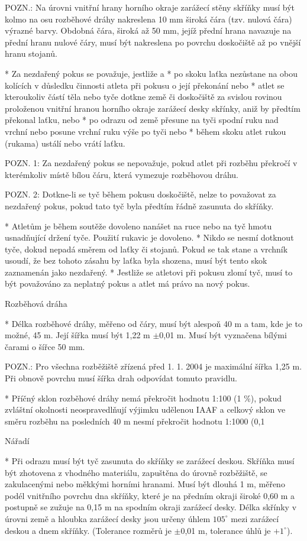 POZN.: Na úrovni vnitřní hrany horního okraje zarážecí stěny skříňky musí být kolmo na osu rozběhové dráhy nakreslena 10 mm široká čára (tzv. nulová čára) výrazné barvy. Obdobná čára, široká až 50 mm, jejíž přední hrana navazuje na přední hranu nulové čáry, musí být nakreslena po povrchu doskočiště až po vnější hranu stojanů.

* Za nezdařený pokus se považuje, jestliže
  \begitems \style a
  * po skoku laťka nezůstane na obou kolících v důsledku činnosti atleta při pokusu o její překonání nebo
  * atlet se kteroukoliv částí těla nebo tyče dotkne země či doskočiště za svislou rovinou proloženou vnitřní hranou horního okraje zarážecí desky skřínky, aniž by předtím překonal laťku, nebo
  * po odrazu od země přesune na tyči spodní ruku nad vrchní nebo posune vrchní ruku výše po tyči nebo
  * během skoku atlet rukou (rukama) ustálí nebo vrátí laťku.
  \enditems

POZN. 1: Za nezdařený pokus se nepovažuje, pokud atlet při rozběhu překročí v kterémkoliv místě bílou čáru, která vymezuje rozběhovou dráhu.

POZN. 2: Dotkne-li se tyč během pokusu doskočiště, nelze to považovat za nezdařený pokus, pokud tato tyč byla předtím řádně zasunuta do skříňky.

* Atletům je během soutěže dovoleno nanášet na ruce nebo na tyč hmotu usnadňující držení tyče. Použití rukavic je dovoleno.
* Nikdo se nesmí dotknout tyče, dokud nepadá směrem od laťky či stojanů. Pokud se tak stane a vrchník usoudí, že bez tohoto zásahu by laťka byla shozena, musí být tento skok zaznamenán jako nezdařený.
* Jestliže se atletovi při pokusu zlomí tyč, musí to být považováno za neplatný pokus a atlet má právo na nový pokus.

Rozběhová dráha

* Délka rozběhové dráhy, měřeno od  čáry, musí být alespoň 40 m a tam, kde je to možné, 45 m. Její šířka musí být 1,22 m $\pm$0,01 m. Musí být vyznačena bílými čarami o šířce 50 mm.

POZN.: Pro všechna rozběžiště zřízená před 1. 1. 2004 je maximální šířka 1,25 m. Při obnově povrchu musí šířka drah odpovídat tomuto pravidlu.

* Příčný sklon rozběhové dráhy nemá překročit hodnotu 1:100 (1 \%), pokud zvláštní okolnosti neospravedlňují výjimku udělenou IAAF a celkový sklon ve směru rozběhu na posledních 40 m nesmí překročit hodnotu 1:1000 (0,1 %

Nářadí

* Při odrazu musí být tyč zasunuta do skříňky se zarážecí deskou. Skříňka musí být zhotovena z vhodného materiálu, zapuštěna do úrovně rozběžiště, se zakulacenými nebo měkkými horními hranami. Musí být dlouhá 1 m, měřeno podél vnitřního povrchu dna skříňky, které je na předním okraji široké 0,60 m a postupně se zužuje na 0,15 m na spodním okraji zarážecí desky. Délka skřínky v úrovni země a hloubka zarážecí desky jsou určeny úhlem $105^\circ$ mezi zarážecí deskou a dnem skříňky. (Tolerance rozměrů je $\pm$0,01 m, tolerance úhlů je $+1^\circ$).

